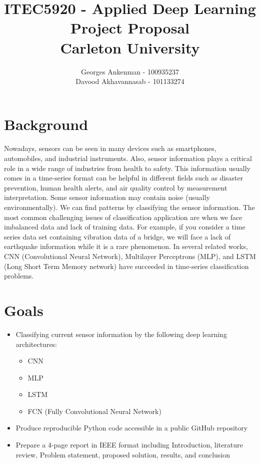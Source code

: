 \documentclass[10pt,letterpaper]{article}
\author{Georges Ankenman - 100935237 \\Davood Akhavannasab - 101133274}
\title{ITEC5920 - Applied Deep Learning \\ Project Proposal \\ Carleton University}
\begin{document}
\maketitle
\newpage
\section*{Background}
\paragraph{}Nowadays, sensors can be seen in many devices such as smartphones, automobiles, and industrial instruments. Also, sensor information plays a critical role in a wide range of industries from health to safety. This information usually comes in a time-series format can be helpful in different fields such as disaster prevention, human health alerts, and air quality control by measurement interpretation. Some sensor information may contain noise (usually environmentally). We can find patterns by classifying the sensor information. The most common challenging issues of classification application are when we face imbalanced data and lack of training data. For example, if you consider a time series data set containing vibration data of a bridge, we will face a lack of earthquake information while it is a rare phenomenon. In several related works, CNN (Convolutional Neural Network), Multilayer Perceptrons (MLP), and LSTM (Long Short Term Memory network) have succeeded in time-series classification problems.
\section*{Goals}
\begin{itemize}
\item Classifying current sensor information by the following deep learning architectures:
\begin{itemize}
\item CNN
\item MLP
\item LSTM
\item FCN (Fully Convolutional Neural Network)
\end{itemize}
\item Produce reproducible Python code accessible in a public GitHub repository
\item Prepare a 4-page report in IEEE format including Introduction, literature review, Problem statement, proposed solution, results, and conclusion 
\end{itemize}
\end{document}
